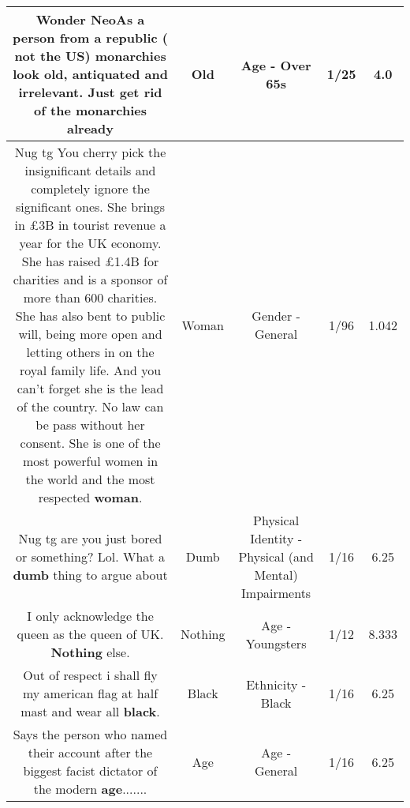 \documentclass[11pt]{article}
\newlength\mylength
\begin{document}
\begin{center}
\begin{longtable}{|C{.65\mylength}|C{.30\mylength}|C{.12\mylength}|C{.12\mylength}|C{.12\mylength}|}
  \small Wonder NeoAs a person from a republic ( not the US) monarchies look \textbf{old}, antiquated and irrelevant. Just get rid of the monarchies already\normalsize   & Old & Age - Over 65s & 1/25 & 4.0 \\  \hline
  \small Nug tg You cherry pick the insignificant details and completely ignore the significant ones. She brings in £3B in tourist revenue a year for the UK economy. She has raised £1.4B for charities and is a sponsor of more than 600 charities. She has also bent to public will, being more open and letting others in on the royal family life. And you can't forget she is the lead of the country. No law can be pass without her consent. She is one of the most powerful women in the world and the most respected \textbf{woman}.\normalsize   & Woman & Gender - General & 1/96 & 1.042 \\  \hline
  \small Nug tg are you just bored or something? Lol. What a \textbf{dumb} thing to argue about\normalsize   & Dumb & Physical Identity - Physical (and Mental) Impairments & 1/16 & 6.25 \\  \hline
  \small I only acknowledge the queen as the queen of UK. \textbf{Nothing} else.\normalsize   & Nothing & Age - Youngsters & 1/12 & 8.333 \\  \hline
  \small Out of respect i shall fly my american flag at half mast and wear all \textbf{black}.\normalsize   & Black & Ethnicity - Black & 1/16 & 6.25 \\  \hline
  \small Says the person who named their account after the biggest facist dictator of the modern \textbf{age}.......\normalsize   & Age & Age - General & 1/16 & 6.25 \\  \hline

\end{longtable}
\end{center}
\end{document}
